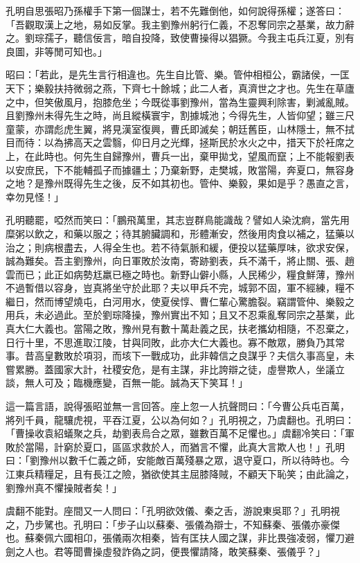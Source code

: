 孔明自思張昭乃孫權手下第一個謀士，若不先難倒他，如何說得孫權；遂答曰：「吾觀取漢上之地，易如反掌。我主劉豫州躬行仁義，不忍奪同宗之基業，故力辭之。劉琮孺子，聽信佞言，暗自投降，致使曹操得以猖獗。今我主屯兵江夏，別有良圖，非等閒可知也。」

昭曰：「若此，是先生言行相違也。先生自比管、樂。管仲相桓公，霸諸侯，一匡天下；樂毅扶持微弱之燕，下齊七十餘城；此二人者，真濟世之才也。先生在草廬之中，但笑傲風月，抱膝危坐；今既從事劉豫州，當為生靈興利除害，剿滅亂賊。且劉豫州未得先生之時，尚且縱橫寰宇，割據城池；今得先生，人皆仰望；雖三尺童蒙，亦謂彪虎生翼，將見漢室復興，曹氏即滅矣；朝廷舊臣，山林隱士，無不拭目而待：以為拂高天之雲翳，仰日月之光輝，拯斯民於水火之中，措天下於衽席之上，在此時也。何先生自歸豫州，曹兵一出，棄甲拋戈，望風而竄；上不能報劉表以安庶民，下不能輔孤子而據疆土；乃棄新野，走樊城，敗當陽，奔夏口，無容身之地？是豫州既得先生之後，反不如其初也。管仲、樂毅，果如是乎？愚直之言，幸勿見怪！」

孔明聽罷，啞然而笑曰：「鵬飛萬里，其志豈群鳥能識哉？譬如人染沈痾，當先用糜粥以飲之，和藥以服之；待其腑臟調和，形體漸安，然後用肉食以補之，猛藥以治之；則病根盡去，人得全生也。若不待氣脈和緩，便投以猛藥厚味，欲求安保，誠為難矣。吾主劉豫州，向日軍敗於汝南，寄跡劉表，兵不滿千，將止關、張、趙雲而已；此正如病勢尪羸已極之時也。新野山僻小縣，人民稀少，糧食鮮薄，豫州不過暫借以容身，豈真將坐守於此耶？夫以甲兵不完，城郭不固，軍不經練，糧不繼日，然而博望燒屯，白河用水，使夏侯惇、曹仁輩心驚膽裂。竊謂管仲、樂毅之用兵，未必過此。至於劉琮降操，豫州實出不知；且又不忍乘亂奪同宗之基業，此真大仁大義也。當陽之敗，豫州見有數十萬赴義之民，扶老攜幼相隨，不忍棄之，日行十里，不思進取江陵，甘與同敗，此亦大仁大義也。寡不敵眾，勝負乃其常事。昔高皇數敗於項羽，而垓下一戰成功，此非韓信之良謀乎？夫信久事高皇，未嘗累勝。蓋國家大計，社稷安危，是有主謀，非比誇辯之徒，虛譽欺人，坐議立談，無人可及；臨機應變，百無一能。誠為天下笑耳！」

這一篇言語，說得張昭並無一言回答。座上忽一人抗聲問曰：「今曹公兵屯百萬，將列千員，龍驤虎視，平吞江夏，公以為何如？」孔明視之，乃虞翻也。孔明曰：「曹操收袁紹蟻聚之兵，劫劉表烏合之眾，雖數百萬不足懼也。」虞翻冷笑曰：「軍敗於當陽，計窮於夏口，區區求救於人，而猶言不懼，此真大言欺人也！」孔明曰：「劉豫州以數千仁義之師，安能敵百萬殘暴之眾，退守夏口，所以待時也。今江東兵精糧足，且有長江之險，猶欲使其主屈膝降賊，不顧天下恥笑；由此論之，劉豫州真不懼操賊者矣！」

虞翻不能對。座間又一人問曰：「孔明欲效儀、秦之舌，游說東吳耶？」孔明視之，乃步騭也。孔明曰：「步子山以蘇秦、張儀為辯士，不知蘇秦、張儀亦豪傑也。蘇秦佩六國相卬，張儀兩次相秦，皆有匡扶人國之謀，非比畏強凌弱，懼刀避劍之人也。君等聞曹操虛發詐偽之詞，便畏懼請降，敢笑蘇秦、張儀乎？」

